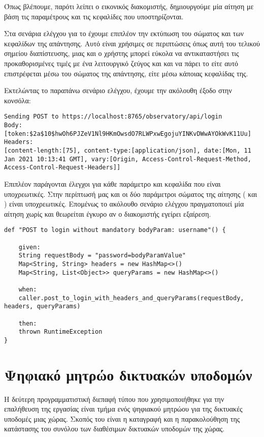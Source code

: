 \begin{itemize}
Όπως βλέπουμε,
παρότι λείπει ο εικονικός διακομιστής,
δημιουργούμε μία αίτηση με βάση τις παραμέτρους και τις κεφαλίδες που υποστηρίζονται.

Στα σενάρια ελέγχου για το  έχουμε επιπλέον την εκτύπωση του σώματος και των κεφαλίδων της απάντησης.
Αυτό είναι χρήσιμες σε περιπτώσεις όπως αυτή του τελικού σημείου διαπίστευσης,
μιας και ο χρήστης μπορεί εύκολα να αντικαταστήσει τις προκαθορισμένες τιμές με ένα λειτουργικό ζεύγος 
 και  και να πάρει το  είτε αυτό επιστρέφεται 
μέσω του σώματος της απάντησης,
είτε μέσω κάποιας κεφαλίδας της.

Εκτελώντας το παραπάνω σενάριο ελέγχου,
έχουμε την ακόλουθη έξοδο στην κονσόλα:

\begin{lstlisting}[deletekeywords={api}]
Sending POST to https://localhost:8765/observatory/api/login
Body:
[token:$2a$10$hwOh6PJZeV1Nl9HKmOwsdO7RLWPxwEgojuYINKvDWwAYOkWvK11Uu]
Headers:
[content-length:[75], content-type:[application/json], date:[Mon, 11 Jan 2021 10:13:41 GMT], vary:[Origin, Access-Control-Request-Method, Access-Control-Request-Headers]]
\end{lstlisting}

Επιπλέον παράγονται έλεγχοι για κάθε παράμετρο και κεφαλίδα που είναι υποχρεωτικές.
Στην περίπτωσή μας και οι δύο παράμετροι σώματος της αίτησης ( και ) είναι υποχρεωτικές.
Επομένως το ακόλουθο σενάριο ελέγχου πραγματοποιεί μία αίτηση χωρίς 
και θεωρείται έγκυρο αν ο διακομιστής εγείρει εξαίρεση.

\begin{lstlisting}
def "POST to login without mandatory bodyParam: username"() {

    given:
    String requestBody = "password=bodyParamValue"
    Map<String, String> headers = new HashMap<>()
    Map<String, List<Object>> queryParams = new HashMap<>()

    when:
    caller.post_to_login_with_headers_and_queryParams(requestBody, headers, queryParams)

    then:
    thrown RuntimeException
}
\end{lstlisting}
    \end{itemize}

\section{Ψηφιακό μητρώο δικτυακών υποδομών}
Η δεύτερη προγραμματιστική διεπαφή τύπου  που χρησιμοποιήθηκε για την επαλήθευση της εργασίας
είναι τμήμα ενός ψηφιακού μητρώου για της δικτυακές υποδομές μιας χώρας.
Σκοπός του είναι η καταγραφή και η παρακολούθηση της κατάστασης
του συνόλου των διαθέσιμων δικτυακών υποδομών της χώρας.

